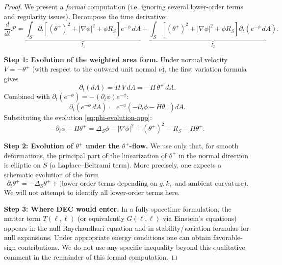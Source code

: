 \begin{proof}
We present a \emph{formal} computation (i.e. ignoring several lower-order terms and regularity issues). Decompose the time derivative:
\begin{equation}
\frac{d}{dt}\mathcal{P} = \underbrace{\int_S \partial_t\left[(\theta^+)^2 + |\nabla\phi|^2 + \phi R_S\right]e^{-\phi} \, dA}_{I_1} + \underbrace{\int_S \left[(\theta^+)^2 + |\nabla\phi|^2 + \phi R_S\right]\partial_t(e^{-\phi} \, dA)}_{I_2}.
\end{equation}

\textbf{Step 1: Evolution of the weighted area form.}
Under normal velocity $V = -\theta^+$ (with respect to the outward unit normal $\nu$), the first variation formula gives
\begin{equation}
\partial_t(dA) = H\,V\, dA = -H\,\theta^+\, dA.
\end{equation}
Combined with $\partial_t(e^{-\phi}) = -(\partial_t\phi)e^{-\phi}$:
\begin{equation}
\partial_t(e^{-\phi} \, dA) = e^{-\phi}\left(-\partial_t\phi - H\theta^+\right)dA.
\end{equation}
Substituting the evolution \eqref{eq:phi-evolution-app}:
\begin{equation}
-\partial_t\phi - H\theta^+ = \Delta_S\phi - |\nabla\phi|^2 + (\theta^+)^2 - R_S - H\theta^+.
\end{equation}

\textbf{Step 2: Evolution of $\theta^+$ under the $\theta^+$-flow.}
We use only that, for smooth deformations, the principal part of the linearization of $\theta^+$ in the normal direction is elliptic on $S$ (a Laplace--Beltrami term). More precisely, one expects a schematic evolution of the form
\begin{equation}
\partial_t\theta^+ = -\Delta_S\theta^+ + \text{(lower order terms depending on } g,k,\text{ and ambient curvature)}.
\label{eq:theta-evolution-schematic-app}
\end{equation}
We will not attempt to identify all lower-order terms here.

\textbf{Step 3: Where DEC would enter.}
In a fully spacetime formulation, the matter term $T(\ell,\ell)$ (or equivalently $G(\ell,\ell)$ via Einstein's equations) appears in the null Raychaudhuri equation and in stability/variation formulas for null expansions. Under appropriate energy conditions one can obtain favorable-sign contributions. We do not use any specific inequality beyond this qualitative comment in the remainder of this formal computation.


\end{proof}
